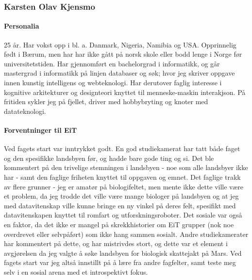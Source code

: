 \subsubsection{Karsten Olav Kjensmo}

\paragraph{Personalia}
25 år. Har vokst opp i bl. a. Danmark, Nigeria, Namibia og USA. Opprinnelig født i Bærum, men har har ikke gått på norsk skole eller bodd lenge i Norge før universitetstiden. Har gjennomført en bachelorgrad i informatikk, og går mastergrad i informatikk på linjen databaser og søk; hvor jeg skriver oppgave innen kunstig intelligens og webteknologi. Har derutover faglig interesse i kognitive arkitekturer og designteori knyttet til menneske-maskin interakjson. På fritiden sykler jeg på fjellet, driver med hobbybryting og knoter med datateknologi. 

\paragraph{Forventninger til EiT}
Ved fagets start var inntrykket godt. En god studiekamerat har tatt både faget og den spesifikke landsbyen før, og hadde bare gode ting og si. Det ble kommentert på den trivelige stemningen i landsbyen - noe som alle landsbyer ikke har - samt den faglige friheten knyttet til oppgaven og emnet. Det faglige trakk av flere grunner - jeg er amatør på biologifeltet, men mente ikke dette ville være et problem, da jeg trodde det ville være mange biologer på landsbyen og at jeg med datavitenskap ville kunne bringe en ny vinkel på deres felt, spesifikt med datavitenskapen knyttet til romfart og utforskningsroboter. Det sosiale var også en faktor, da det ikke er mangel på skrekkhistorier om EiT grupper (nok noe overdrevet eller selvpåført) som ikke hang sammen sosialt. Andre studiekamerater har kommentert på dette, og har mistrivdes stort, og dette var et element i avgjørelsen da jeg valgte å søke landsbyen for biologisk skattejakt på Mars. Ved fagets start var jeg altså innstillt på å lære fra andre fagfelter, samt teste meg selv i en sosial arena med et introspektivt fokus. 




